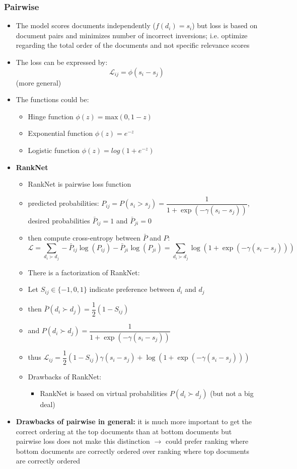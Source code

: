 \subsubsection{Pairwise} 
\begin{itemize}
	\item The model scores documents independently ($f(d_i) = s_i$) but loss is based on document pairs and minimizes number of incorrect inversions; i.e. optimize regarding the total order of the documents and not specific relevance scores
	\item The loss can be expressed by: 
	$$\mathcal{L}_{ij} = \phi(s_i - s_j)$$ (more general)
	\item The functions could be:
	\begin{itemize}
		\item Hinge function $\phi(z) = \mathrm{max}( 0,1-z)$
		\item Exponential function $\phi(z) = e^{-z}$
		\item Logistic function $\phi(z) = log(1+e^{-z})$
	\end{itemize}
	\item \textbf{RankNet}
	\begin{itemize}
		\item RankNet is pairwise loss function
		\item predicted probabilities: $P_{ij} = P(s_i > s_j) = \dfrac{1}{1+\exp (-\gamma (s_i - s_j))} $, desired probabilities $\bar{P}_{ij}=1$ and $\bar{P}_{ji}=0$
		\item then compute cross-entropy between $\bar{P}$ and $P$:
		$$\mathcal{L} = \sum_{d_i \succ d_j} -\bar{P}_{ij} \log (P_{ij}) - \bar{P}_{ji} \log (P_{ji}) = \sum_{d_i \succ d_j} \log (1 + \exp (-\gamma (s_i - s_j)))$$
		\item There is a factorization of RankNet:
		\item Let $S_{ij} \in \{-1,0,1\}$ indicate preference between $d_i$ and $d_j$
		\item then $\bar{P}(d_i \succ d_j) = \dfrac{1}{2} (1 - S_{ij})$
		\item and $P(d_i \succ d_j) = \dfrac{1}{1+\exp (-\gamma (s_i - s_j))}$
		\item thus $\mathcal{L}_{ij} = \dfrac{1}{2}(1 - S_{ij}) \gamma (s_i - s_j) + \log (1 + \exp (-\gamma (s_i - s_j)))$
		\item Drawbacks of RankNet:
		\begin{itemize}
			\item RankNet is based on virtual probabilities $P(d_i \succ d_j)$ (but not a big deal)
		\end{itemize}
	\end{itemize}
	\item \textbf{Drawbacks of pairwise in general:} it is much more important to get the correct ordering at the top documents than at bottom documents but pairwise loss does not make this distinction $\rightarrow$ could prefer ranking where bottom documents are correctly ordered over ranking where top documents are correctly ordered
\end{itemize}
